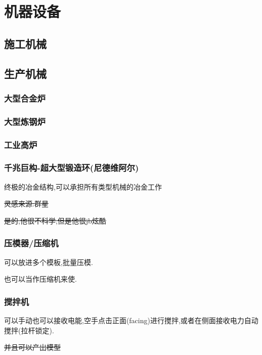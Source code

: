 \section{机器设备}{
  \subsection{施工机械}{

  }

  \subsection{生产机械}{
      \subsubsection{大型合金炉}{

      }\label{big_alloy_furnace}

      \subsubsection{大型炼钢炉}{

      }\label{steelmaking_furnace}

      \subsubsection{工业高炉}{

      }\label{industrial_blast_furnace}

      \subsubsection{千兆巨构-超大型锻造环(尼德维阿尔)}{
          终极的冶金结构,可以承担所有类型机械的冶金工作

          \sout{灵感来源:群星}

          \sout{是的,他很不科学,但是他很jb炫酷}
      }\label{megastructure_nidwerl}

      \subsubsection{压模器/压缩机}{
          可以放进多个模板,批量压模.

          也可以当作压缩机来使.
      }\label{compressor}

      \subsubsection{搅拌机}{
          可以手动也可以接收电能,空手点击正面(facing)进行搅拌,或者在侧面接收电力自动搅拌(拉杆锁定).

          \sout{并且可以产出模型}
      }\label{blender}
  }
 }